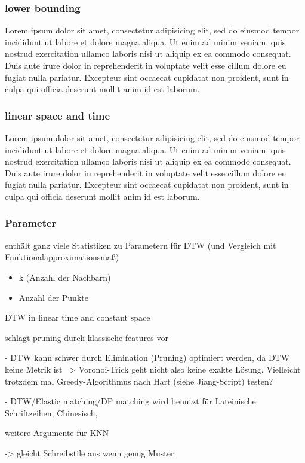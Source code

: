 \subsubsection{lower bounding} %
\label{ssub:lower_bounding}
Lorem ipsum dolor sit amet, consectetur adipisicing elit, sed do eiusmod tempor incididunt ut labore et dolore magna aliqua. Ut enim ad minim veniam, quis nostrud exercitation ullamco laboris nisi ut aliquip ex ea commodo consequat. Duis aute irure dolor in reprehenderit in voluptate velit esse cillum dolore eu fugiat nulla pariatur. Excepteur sint occaecat cupidatat non proident, sunt in culpa qui officia deserunt mollit anim id est laborum.

\subsubsection{linear space and time} %
\label{ssub:linear_space_and_time}
Lorem ipsum dolor sit amet, consectetur adipisicing elit, sed do eiusmod tempor incididunt ut labore et dolore magna aliqua. Ut enim ad minim veniam, quis nostrud exercitation ullamco laboris nisi ut aliquip ex ea commodo consequat. Duis aute irure dolor in reprehenderit in voluptate velit esse cillum dolore eu fugiat nulla pariatur. Excepteur sint occaecat cupidatat non proident, sunt in culpa qui officia deserunt mollit anim id est laborum.

\subsubsection{\TODO Parameter} %
\label{ssub:todo_parameter}


\citet{Golubitsky:2009p1842} enthält ganz viele Statistiken zu Parametern für DTW (und Vergleich mit Funktionalapproximationsmaß)
\begin{itemize}
  \item k (Anzahl der Nachbarn)
  \item Anzahl der Punkte
\end{itemize}



\cite{MacLean:2010p9970} DTW in linear time and constant space

\cite{Watt:2005p1816} schlägt pruning durch klassische features vor

- DTW kann schwer durch Elimination (Pruning) optimiert werden, da DTW keine Metrik ist ~> Voronoi-Trick geht nicht also keine exakte Lösung. Vielleicht trotzdem mal Greedy-Algorithmus nach Hart (siehe Jiang-Script) testen?

- DTW/Elastic matching/DP matching wird benutzt für Lateinische Schriftzeihen, Chinesisch, \cite{Tappert:1990p10302}

weitere Argumente für KNN

-> gleicht Schreibstile aus wenn genug Muster

